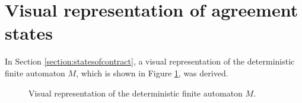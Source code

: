 \pagebreak

\section{Visual representation of agreement states} \label{section:appendixdfa}

In Section \ref{section:statesofcontract}, a visual representation of the deterministic finite automaton $M$, which is shown in Figure \ref{fig:dfa}, was derived.

\begin{figure}[H]
\begin{center}

\caption{Visual representation of the deterministic finite automaton $M$.}
\label{fig:dfa}
\end{center}
\end{figure}